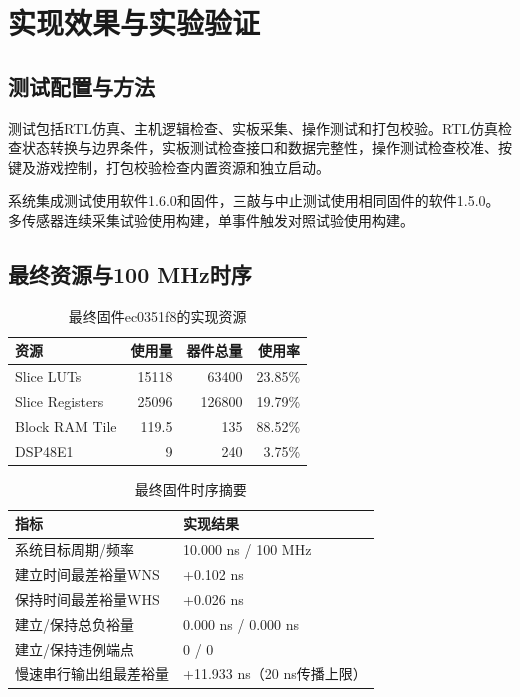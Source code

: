 \chapter{实现效果与实验验证}
\section{测试配置与方法}
测试包括RTL仿真、主机逻辑检查、实板采集、操作测试和打包校验。RTL仿真检查状态转换与边界条件，实板测试检查接口和数据完整性，操作测试检查校准、按键及游戏控制，打包校验检查内置资源和独立启动。

系统集成测试使用软件1.6.0和固件，三敲与中止测试使用相同固件的软件1.5.0。多传感器连续采集试验使用构建，单事件触发对照试验使用构建。

\section{最终资源与100 MHz时序}
\begin{table}[H]\centering\caption{最终固件ec0351f8的实现资源}\small
\begin{tabular}{lrrr}\toprule 资源 & 使用量 & 器件总量 & 使用率\\\midrule
Slice LUTs &15118&63400&23.85\%\\
Slice Registers &25096&126800&19.79\%\\
Block RAM Tile &119.5&135&88.52\%\\
DSP48E1 &9&240&3.75\%\\\bottomrule\end{tabular}
\end{table}

\begin{table}[H]\centering\caption{最终固件时序摘要}\small
\begin{tabularx}{\linewidth}{p{54mm}Y}\toprule 指标 & 实现结果\\\midrule
系统目标周期/频率 &10.000 ns / 100 MHz\\
建立时间最差裕量WNS &+0.102 ns\\
保持时间最差裕量WHS &+0.026 ns\\
建立/保持总负裕量 &0.000 ns / 0.000 ns\\
建立/保持违例端点 &0 / 0\\
慢速串行输出组最差裕量 &+11.933 ns（20 ns传播上限）\\\bottomrule
\end{tabularx}\end{table}

